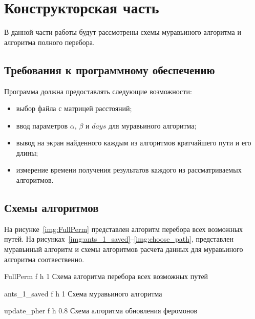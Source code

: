 \chapter{Конструкторская часть}
В данной части работы будут рассмотрены схемы муравьиного алгоритма и алгоритма полного перебора.

\section{Требования к программному обеспечению}
Программа должна предоставлять следующие возможности:
\begin{itemize}
	\item выбор файла с матрицей расстояний;
	\item ввод параметров $\alpha$, $\beta$ и $days$ для муравьиного алгоритма;
	\item вывод на экран найденного каждым из алгоритмов кратчайшего пути и его длины;
	\item измерение времени получения результатов каждого из рассматриваемых алгоритмов.
\end{itemize}


\section{Схемы алгоритмов}
На рисунке~\ref{img:FullPerm} представлен алгоритм перебора всех возможных путей.
На рисунках~\ref{img:ants_1_saved}--\ref{img:choose_path}, представлен муравьиный алгоритм и схемы алгоритмов расчета данных для муравьиного алгоритма соотвественно.


{FullPerm} %
{f} %
{h} %
{1\textwidth} %
{Схема алгоритма перебора всех возможных путей} %

{ants_1_saved} %
{f} %
{h} %
{1\textwidth} %
{Схема муравьиного алгоритма} %


{update_pher} %
{f} %
{h} %
{0.8\textwidth} %
{Схема алгоритма обновления феромонов} %

